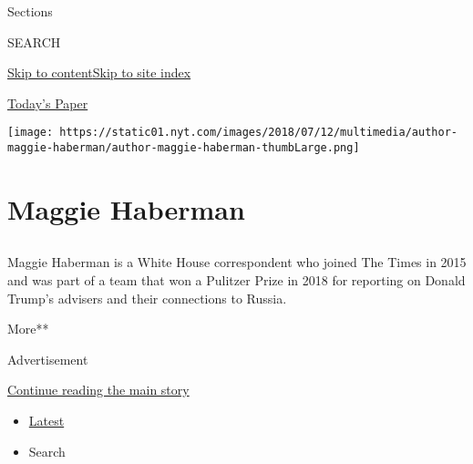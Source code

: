 Sections

SEARCH

\protect\hyperlink{site-content}{Skip to
content}\protect\hyperlink{site-index}{Skip to site index}

\href{https://myaccount.nytimes.com/auth/login?response_type=cookie\&client_id=vi}{}

\href{https://www.nytimes.com/section/todayspaper}{Today's Paper}

\texttt{[image: https://static01.nyt.com/images/2018/07/12/multimedia/author-maggie-haberman/author-maggie-haberman-thumbLarge.png]}

\hypertarget{maggie-haberman}{%
\section{Maggie Haberman}\label{maggie-haberman}}

\subsection{}

Maggie Haberman is a White House correspondent who joined The Times in
2015 and was part of a team that won a Pulitzer Prize in 2018 for
reporting on Donald Trump's advisers and their connections to Russia.

More**

Advertisement

\protect\hyperlink{after-mid1}{Continue reading the main story}

\begin{itemize}
\tightlist
\item
  \protect\hyperlink{stream-panel}{Latest}
\item
  Search
\end{itemize}

